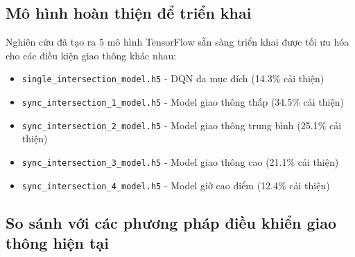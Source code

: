 \subsection{Mô hình hoàn thiện để triển khai}

Nghiên cứu đã tạo ra 5 mô hình TensorFlow sẵn sàng triển khai được tối ưu hóa 
cho các điều kiện giao thông khác nhau:

\begin{itemize}
    \item \texttt{single\_intersection\_model.h5} - DQN đa mục đích (14.3\% cải thiện)
    \item \texttt{sync\_intersection\_1\_model.h5} - Model giao thông thấp (34.5\% cải thiện)
    \item \texttt{sync\_intersection\_2\_model.h5} - Model giao thông trung bình (25.1\% cải thiện)  
    \item \texttt{sync\_intersection\_3\_model.h5} - Model giao thông cao (21.1\% cải thiện)
    \item \texttt{sync\_intersection\_4\_model.h5} - Model giờ cao điểm (12.4\% cải thiện)
\end{itemize}

\subsection{So sánh với các phương pháp điều khiển giao thông hiện tại}


